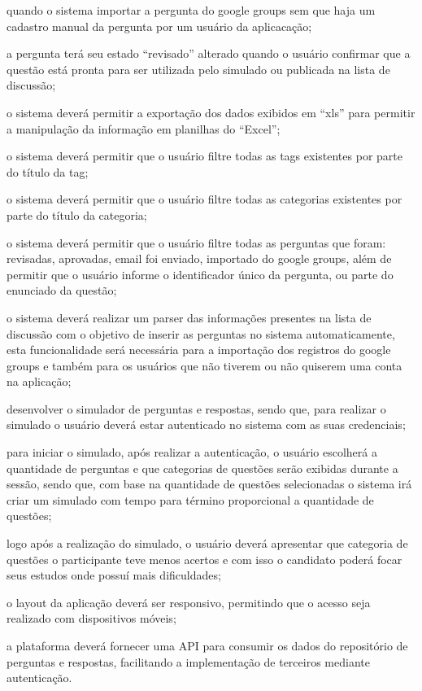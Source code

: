 \begin{alineas}
    quando o sistema importar a pergunta do google groups sem que haja um
    cadastro manual da pergunta por um usuário da aplicacação;
    \item a pergunta terá seu estado ``revisado'' alterado quando o usuário
    confirmar que a questão está pronta para ser utilizada pelo simulado ou
    publicada na lista de discussão;
    \item o sistema deverá permitir a exportação dos dados exibidos em ``xls''
    para permitir a manipulação da informação em planilhas do ``Excel'';
    \item o sistema deverá permitir que o usuário filtre todas as tags
    existentes por parte do título da tag;
    \item o sistema deverá permitir que o usuário filtre todas as categorias
    existentes por parte do título da categoria;
    \item o sistema deverá permitir que o usuário filtre todas as perguntas que
    foram: revisadas, aprovadas, email foi enviado, importado do google groups,
    além de permitir que o usuário informe o identificador único da pergunta, ou
    parte do enunciado da questão;
    \item o sistema deverá realizar um parser das informações presentes na lista
    de discussão com o objetivo de inserir as perguntas no sistema
    automaticamente, esta funcionalidade será necessária para a importação dos
    registros do google groups e também para os usuários que não tiverem ou não
    quiserem uma conta na aplicação;
    \item desenvolver o simulador de perguntas e respostas, sendo que, para
    realizar o simulado o usuário deverá estar autenticado no sistema com as
    suas credenciais;
    \item para iniciar o simulado, após realizar a autenticação, o usuário
    escolherá a quantidade de perguntas e que categorias de questões serão
    exibidas durante a sessão, sendo que, com base na quantidade de questões
    selecionadas o sistema irá criar um simulado com tempo para término
    proporcional a quantidade de questões;
    \item logo após a realização do simulado, o usuário deverá apresentar que 
    categoria de questões o participante teve menos acertos e com isso o
    candidato poderá focar seus estudos onde possuí mais dificuldades;
    \item o layout da aplicação deverá ser responsivo, permitindo que o acesso
    seja realizado com dispositivos móveis;
    \item a plataforma deverá fornecer uma \acs{API} para consumir os dados do
    repositório de perguntas e respostas, facilitando a implementação de
    terceiros mediante autenticação.
\end{alineas}

